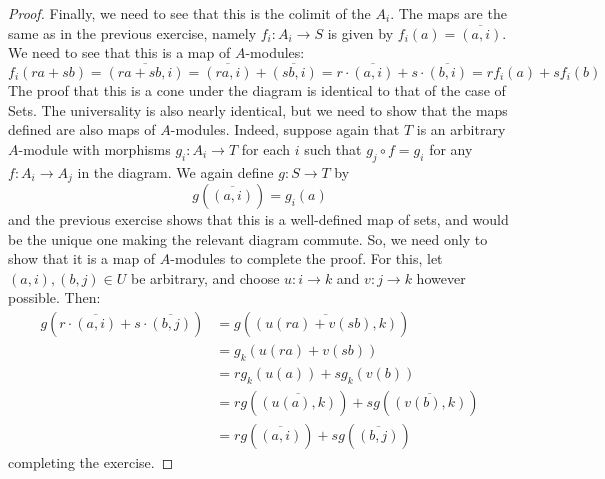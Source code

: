 \documentclass[12pt]{exam}
\begin{document}
\begin{proof}
	Finally, we need to see that this is the colimit of the $A_i$. The maps are the same as in the previous exercise, namely $f_i : A_i \to S$ is given by $f_i(a) = \overline{(a,i)}$. We need to see that this is a map of $A$-modules:
	\[ f_i(ra+sb) = \overline{(ra+sb,i)} = \overline{(ra,i)}+\overline{(sb,i)} = r\cdot\overline{(a,i)}+s\cdot\overline{(b,i)} = rf_i(a)+sf_i(b) \]
	The proof that this is a cone under the diagram is identical to that of the case of Sets. The universality is also nearly identical, but we need to show that the maps defined are also maps of $A$-modules. Indeed, suppose again that $T$ is an arbitrary $A$-module with morphisms $g_i : A_i \to T$ for each $i$ such that $g_j \circ f = g_i$ for any $f : A_i \to A_j$ in the diagram. We again define $g : S \to T$ by
	\[ g\left(\overline{(a,i)}\right) = g_i(a) \]
	and the previous exercise shows that this is a well-defined map of sets, and would be the unique one making the relevant diagram commute. So, we need only to show that it is a map of $A$-modules to complete the proof. For this, let $(a,i),(b,j) \in U$ be arbitrary, and choose $u : i \to k$ and $v : j \to k$ however possible. Then:
	\begin{align*}
	g\left(r\cdot\overline{(a,i)}+s\cdot\overline{(b,j)}\right)
		&= g\left(\overline{(u(ra)+v(sb),k)}\right) \\
		&= g_k(u(ra)+v(sb)) \\
		&= rg_k(u(a))+sg_k(v(b)) \\
		&= rg(\overline{(u(a),k)})+sg(\overline{(v(b),k)}) \\
		&= rg(\overline{(a,i)})+sg(\overline{(b,j)})
	\end{align*}
	completing the exercise.
\end{proof}
\end{document}
